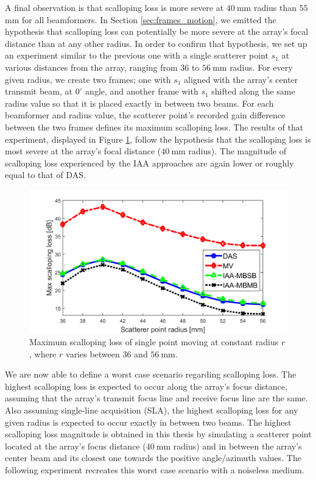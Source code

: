 A final observation is that scalloping loss is more severe at $40~$mm radius than $55~$mm for all beamformers. In Section \ref{sec:frames_motion}, we emitted the hypothesis that scalloping loss can potentially be more severe at the array's focal distance than at any other radius.
In order to confirm that hypothesis, we set up an experiment similar to the previous one with a single scatterer point $s_1$ at various distances from the array, ranging from $36$ to $56~$mm radius.
For every given radius, we create two frames; one with $s_1$ aligned with the array's center transmit beam, at $0^\circ$ angle, and another frame with $s_1$ shifted along the same radius value so that it is placed exactly in between two beams.
For each beamformer and radius value, the scatterer point's recorded gain difference between the two frames defines its maximum scalloping loss.
The results of that experiment, displayed in Figure \ref{fig:loss_vs_range}, follow the hypothesis that the scalloping loss is most severe at the array's focal distance ($40~$mm radius).
The magnitude of scalloping loss experienced by the IAA approaches are again lower or roughly equal to that of DAS.
\begin{figure}[ht]
    \centering
    \includegraphics[width=\linewidth]{./images/results/1/loss_vs_range.png}
	\caption{Maximum scalloping loss of single point moving at constant radius $r$, where $r$ varies between $36$ and $56~$mm.}
	\label{fig:loss_vs_range}
\end{figure}

We are now able to define a worst case scenario regarding scalloping loss. The highest scalloping loss is expected to occur along the array's focus distance, assuming that the array's transmit focus line and receive focus line are the same.
Also assuming single-line acquisition (SLA), the highest scalloping loss for any given radius is expected to occur exactly in between two beams.
The highest scalloping loss magnitude is obtained in this thesis by simulating a scatterer point located at the array's focus distance ($40~$mm radius) and in between the array's center beam and its closest one towards the positive angle/azimuth values.
The following experiment recreates this worst case scenario with a noiseless medium.

